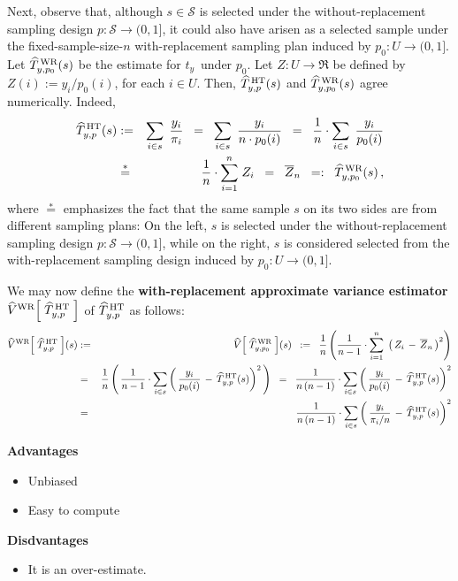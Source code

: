 Next, observe that, although \;$s \in \mathcal{S}$\; is selected under the
without-replacement sampling design \;$p : \mathcal{S} \longrightarrow (0,1]$,\;
it could also have arisen as a selected sample under the fixed-sample-size-$n$
with-replacement sampling plan induced by \;$p_{0} : U \longrightarrow (0,1]$.\;
Let \;$\widehat{T}^{\,\textnormal{WR}}_{y,p_{0}}(s)$\; be the estimate for
\;$t_{y}$\, under \;$p_{0}$.\;
Let \;$Z : U \longrightarrow \Re$\; be defined by
\;$Z(i) := y_{i} / p_{0}(i)$,\; for each \;$i \in U$.\;
Then,
\;$\widehat{T}^{\,\textnormal{HT}}_{y,p}(s)$\; and
\;$\widehat{T}^{\,\textnormal{WR}}_{y,p_{0}}(s)$\;
agree numerically.
Indeed,
\begin{eqnarray*}
\widehat{T}^{\,\textnormal{HT}}_{y,p}(s)
& := &
	\underset{i \in s}{\sum}\;\, \dfrac{y_{i}}{\pi_{i}}
\;\; = \;\;
	\underset{i \in s}{\sum}\;\, \dfrac{y_{i}}{n \cdot p_{0}(i)}
\;\; = \;\;
	\dfrac{1}{n}\cdot \underset{i \in s}{\sum}\;\, \dfrac{y_{i}}{p_{0}(i)}
\\
& \overset{*}{=} &
	\dfrac{1}{n}\cdot \overset{n}{\underset{i = 1}{\sum}}\; Z_{i}
\;\; = \;\;
	\overline{Z}_{n}
\;\; =: \;\;
	\widehat{T}^{\,\textnormal{WR}}_{y,p_{0}}(s)\,,
\end{eqnarray*}
where \;$\overset{*}{=}$\; emphasizes the fact that the same sample \;$s$\;
on its two sides are from different sampling plans:
On the left, \;$s$\; is selected under the without-replacement sampling design
$p : \mathcal{S} \longrightarrow (0,1]$, while on the right,
\;$s$\; is considered selected from the with-replacement sampling design
induced by \;$p_{0} : U \longrightarrow (0,1]$.

\vskip 0.5cm
\noindent
We may now define the
\textbf{with-replacement approximate variance estimator}
\;$\widehat{V}^{\textnormal{WR}}\!\left[\;\widehat{T}^{\,\textnormal{HT}}_{y,p}\;\right]$\;
of \;$\widehat{T}^{\,\textnormal{HT}}_{y,p}$\; as follows:
\begin{eqnarray*}
\widehat{V}^{\textnormal{WR}}\!\left[\;\widehat{T}^{\,\textnormal{HT}}_{y,p}\;\right]\!(s)
& := &
	\widehat{V}\!\left[\;\widehat{T}^{\,\textnormal{WR}}_{y,p_{0}}\;\right]\!(s)
\;\; := \;\;
	\dfrac{1}{n}\left(
		\dfrac{1}{n-1}\cdot\overset{n}{\underset{i=1}{\sum}}\;
		\left(\,Z_{i}\,-\,\overline{Z}_{n}\,\right)^{2}
		\right)
\\
& = &
	\dfrac{1}{n}\left(\,
		\dfrac{1}{n-1}\cdot\underset{i \in s}{\sum}
		\left(\,\dfrac{y_{i}}{p_{0}(i)}\,-\,\widehat{T}^{\,\textnormal{HT}}_{y,p}(s)\right)^{2}
		\,\right)
\;\; = \;\;
	\dfrac{1}{n\,(n-1)}\cdot\underset{i \in s}{\sum}
		\left(\,
		\dfrac{y_{i}}{p_{0}(i)}\,-\,\widehat{T}^{\,\textnormal{HT}}_{y,p}(s)
		\right)^{2}
\\
& = &
	\dfrac{1}{n\,(n-1)}\cdot\underset{i \in s}{\sum}
		\left(\,
		\dfrac{y_{i}}{\pi_{i}/n}\,-\,\widehat{T}^{\,\textnormal{HT}}_{y,p}(s)
		\right)^{2}
\end{eqnarray*}

\vskip 0.5cm
\noindent
\textbf{Advantages}
\begin{itemize}
\item
	Unbiased
\item
	Easy to compute
\end{itemize}

\vskip 0.5cm
\noindent
\textbf{Disdvantages}
\begin{itemize}
\item
	It is an over-estimate.
\end{itemize}

